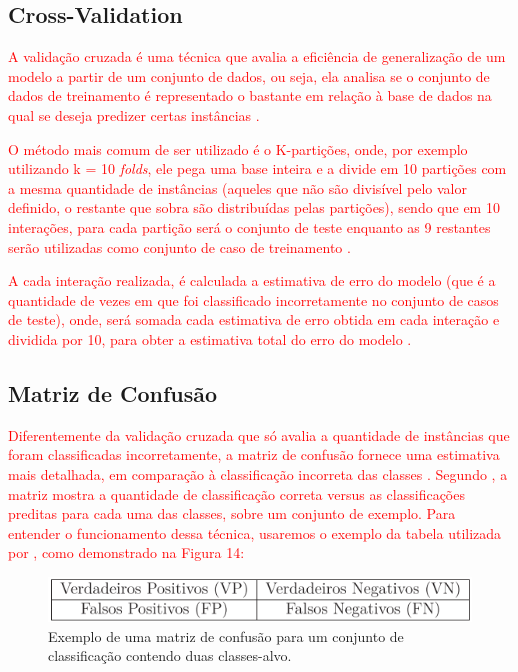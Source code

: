 \subsection{Cross-Validation}

\par
\textcolor{red}{A validação cruzada é uma técnica que avalia a eficiência de generalização de um modelo a partir de um conjunto de dados, ou seja, ela analisa se o conjunto de dados de treinamento é representado o bastante em relação à base de dados na qual se deseja predizer certas instâncias \cite{Carvalho2014, Monard2003}.}

\par
\textcolor{red}{O método mais comum de ser utilizado é o K-partições, onde, por exemplo utilizando k = 10 \textit{folds}, ele pega uma base inteira e a divide em 10 partições com a mesma quantidade de instâncias (aqueles que não são divisível pelo valor definido, o restante que sobra são distribuídas pelas partições), sendo que em 10 interações, para cada partição será o conjunto de teste enquanto as 9 restantes serão utilizadas como conjunto de caso de treinamento \cite{Carvalho2014}.}

\par
\textcolor{red}{A cada interação realizada, é calculada a estimativa de erro do modelo (que é a quantidade de vezes em que foi classificado incorretamente no conjunto de casos de teste), onde, será somada cada estimativa de erro obtida em cada interação e dividida por 10, para obter a estimativa total do erro do modelo \cite{Carvalho2014}.}

\subsection{Matriz de Confusão}

\par
\textcolor{red}{Diferentemente da validação cruzada que só avalia a quantidade de instâncias que foram classificadas incorretamente, a matriz de confusão fornece uma estimativa mais detalhada, em comparação à classificação incorreta das classes \cite{Carvalho2014}. Segundo , a matriz mostra a quantidade de classificação correta versus as classificações preditas para cada uma das classes, sobre um conjunto de exemplo. Para entender o funcionamento dessa técnica, usaremos o exemplo da  tabela utilizada por , como demonstrado na Figura 14:}

\par
\begin{figure}[!htp]
	\begin{center}
    \caption{\label{fig:waveform_fig} Exemplo de uma matriz de confusão para um conjunto de classificação contendo duas classes-alvo.}
	\includegraphics[scale=0.80]{Figuras/Exemplo_matriz_de_confusao.png}
	\end{center}
\end{figure}

